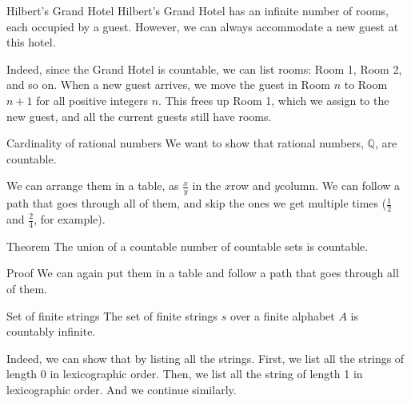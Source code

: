 \documentclass[a4paper]{article}
\begin{document}
\begin{parag}{Hilbert's Grand Hotel}
    Hilbert's Grand Hotel has an infinite number of rooms, each occupied by a guest. However, we can always accommodate a new guest at this hotel.

    Indeed, since the Grand Hotel is countable, we can list rooms: Room 1, Room 2, and so on. When a new guest arrives, we move the guest in Room $n$ to Room $n+1$ for all positive integers $n$. This frees up Room 1, which we assign to the new guest, and all the current guests still have rooms.
\end{parag}

\begin{parag}{Cardinality of rational numbers}
    We want to show that rational numbers, $\mathbb{Q}$, are countable.

    We can arrange them in a table, as $\frac{x}{y}$ in the $x$\Th row and $y$\Th column. We can follow a path that goes through all of them, and skip the ones we get multiple times ($\frac{1}{2}$ and $\frac{2}{4}$, for example).

    \begin{center}
    \end{center}
\end{parag}

\begin{parag}{Theorem}
    The union of a countable number of countable sets is countable.

    \begin{subparag}{Proof}
        We can again put them in a table and follow a path that goes through all of them.
    \end{subparag}
\end{parag}

\begin{parag}{Set of finite strings}
    The set of finite strings $s$ over a finite alphabet $A$ is countably infinite.

    Indeed, we can show that by listing all the strings. First, we list all the strings of length 0 in lexicographic order. Then, we list all the string of length 1 in lexicographic order. And we continue similarly.
\end{parag}
\end{document}
